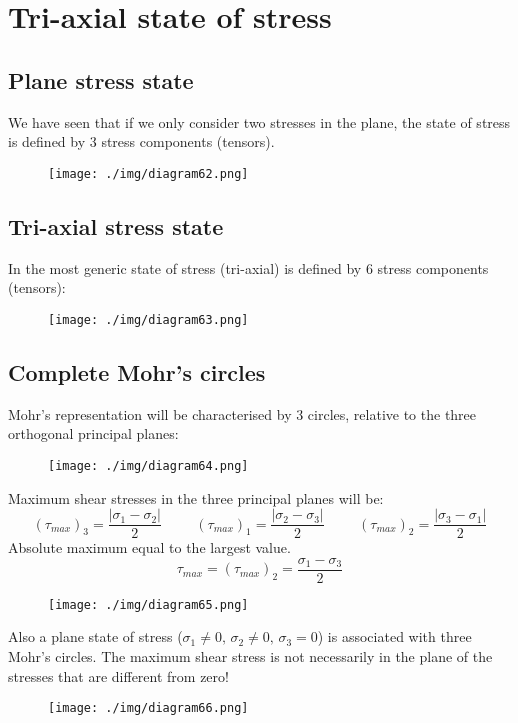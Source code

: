 \section{Tri-axial state of stress}
\subsection{Plane stress state}
We have seen that if we only consider two stresses in the plane, the state of stress is defined by 3 stress components (tensors).
\begin{figure}[H]
  \centering
  \texttt{[image: ./img/diagram62.png]}
  \caption{}
\end{figure}
\subsection{Tri-axial stress state}
In the most generic state of stress (tri-axial) is defined by 6 stress components (tensors):
\begin{figure}[H]
  \centering
  \texttt{[image: ./img/diagram63.png]}
  \caption{}
\end{figure}
\subsection{Complete Mohr's circles}
Mohr's representation will be characterised by 3 circles, relative to the three orthogonal principal planes:
\begin{figure}[H]
  \centering
  \texttt{[image: ./img/diagram64.png]}
  \caption{}
\end{figure}
Maximum shear stresses in the three principal planes will be:
\begin{equation}
  (\tau_{max})_3 = \frac{|\sigma_1 - \sigma_2|}{2} \hspace{1cm} (\tau_{max})_1 = \frac{|\sigma_2 - \sigma_3 |}{2} \hspace{1cm} (\tau_{max})_2 = \frac{|\sigma_3 - \sigma_1 |}{2}
\end{equation}
Absolute maximum equal to the largest value.
\begin{equation}
  \tau_{max} = (\tau_{max})_2 = \frac{\sigma_1 - \sigma_3}{2}
\end{equation}
\begin{figure}[H]
  \centering
  \texttt{[image: ./img/diagram65.png]}
  \caption{}
\end{figure}
Also a plane state of stress ($\sigma_1 \neq 0, \, \sigma_2 \neq 0, \, \sigma_3 = 0$) is associated with three Mohr's circles. The maximum shear stress is not necessarily in the plane of the stresses that are different from zero!
\begin{figure}[H]
  \centering
  \texttt{[image: ./img/diagram66.png]}
  \caption{}
\end{figure}
